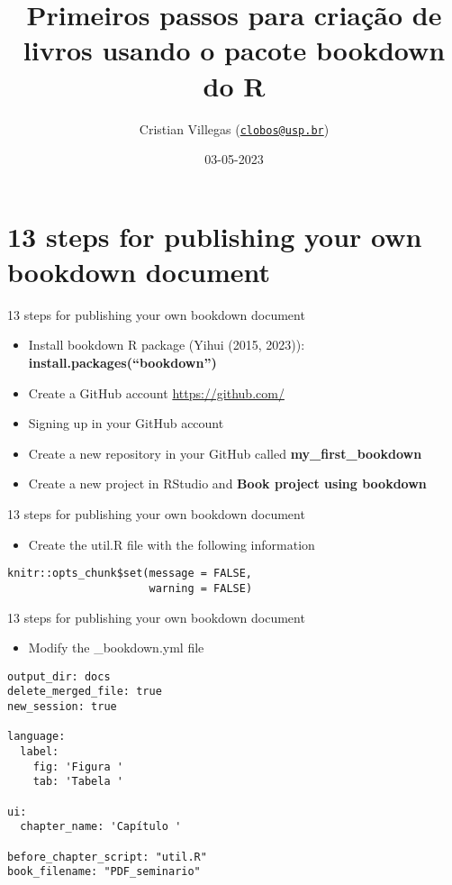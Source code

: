 \documentclass[
  ignorenonframetext,
]{beamer}
\title{Primeiros passos para criação de livros usando o pacote bookdown
do R}
\author{Cristian Villegas
(\href{mailto:clobos@usp.br}{\nolinkurl{clobos@usp.br}})}
\date{03-05-2023}
\institute{USP, Departamento de Ciências Exatas}
\providecommand{\tightlist}{%
  \setlength{\itemsep}{0pt}\setlength{\parskip}{0pt}}
\begin{document}
\frame{\titlepage}

\hypertarget{steps-for-publishing-your-own-bookdown-document}{%
\section{13 steps for publishing your own bookdown
document}\label{steps-for-publishing-your-own-bookdown-document}}

\begin{frame}{13 steps for publishing your own bookdown document}
\protect\hypertarget{steps-for-publishing-your-own-bookdown-document-1}{}
\begin{itemize}
\tightlist
\item
  Install bookdown R package (Yihui (2015, 2023)):
  \textbf{install.packages(``bookdown'')}
\item
  Create a GitHub account \url{https://github.com/}
\item
  Signing up in your GitHub account
\item
  Create a new repository in your GitHub called
  \textbf{my\_first\_bookdown}
\item
  Create a new project in RStudio and \textbf{Book project using
  bookdown}
\end{itemize}
\end{frame}

\begin{frame}[fragile]{13 steps for publishing your own bookdown
document}
\protect\hypertarget{steps-for-publishing-your-own-bookdown-document-2}{}
\begin{itemize}
\tightlist
\item
  Create the util.R file with the following information
\end{itemize}

\begin{verbatim}
knitr::opts_chunk$set(message = FALSE, 
                      warning = FALSE)
\end{verbatim}
\end{frame}

\begin{frame}[fragile]{13 steps for publishing your own bookdown
document}
\protect\hypertarget{steps-for-publishing-your-own-bookdown-document-3}{}
\begin{itemize}
\tightlist
\item
  Modify the \_bookdown.yml file
\end{itemize}

\begin{verbatim}
output_dir: docs
delete_merged_file: true
new_session: true

language:
  label:
    fig: 'Figura '
    tab: 'Tabela '

ui:
  chapter_name: 'Capítulo '
  
before_chapter_script: "util.R"
book_filename: "PDF_seminario" 
\end{verbatim}
\end{frame}
\end{document}
